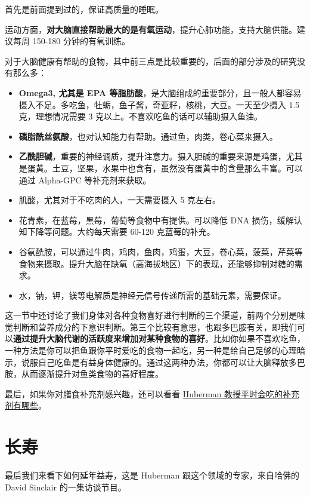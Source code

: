 \documentclass{report}
\begin{document}
首先是前面提到过的，保证高质量的睡眠。

运动方面，\textbf{对大脑直接帮助最大的是有氧运动}，提升心肺功能，支持大脑供能。建议每周 150-180 分钟的有氧训练。

对于大脑健康有帮助的食物，其中前三点是比较重要的，后面的部分涉及的研究没有那么多：

\begin{itemize}
    \item \textbf{Omega3, 尤其是 EPA 等脂肪酸}，是大脑组成的重要部分，且一般人都容易摄入不足。多吃鱼，牡蛎，鱼子酱，奇亚籽，核桃，大豆。一天至少摄入 1.5 克，理想情况需要 3 克以上。不喜欢吃鱼的话可以辅助摄入鱼油。
    \item \textbf{磷脂酰丝氨酸}，也对认知能力有帮助。通过鱼，肉类，卷心菜来摄入。
    \item \textbf{乙酰胆碱}，重要的神经调质，提升注意力。摄入胆碱的重要来源是鸡蛋，尤其是蛋黄。土豆，坚果，水果中也含有，虽然没有蛋黄中的含量那么丰富。可以通过 Alpha-GPC 等补充剂来获取。
    \item 肌酸，尤其对于不吃肉的人，一天需要摄入 5 克左右。
    \item 花青素，在蓝莓，黑莓，葡萄等食物中有提供。可以降低 DNA 损伤，缓解认知下降等问题。大约每天需要 60-120 克蓝莓的补充。
    \item 谷氨酰胺，可以通过牛肉，鸡肉，鱼肉，鸡蛋，大豆，卷心菜，菠菜，芹菜等食物来摄取。提升大脑在缺氧（高海拔地区）下的表现，还能够抑制对糖的需求。
    \item 水，钠，钾，镁等电解质是神经元信号传递所需的基础元素，需要保证。
\end{itemize}

这一节中还讨论了我们身体对各种食物喜好进行判断的三个渠道，前两个分别是味觉判断和营养成分的下意识判断。第三个比较有意思，也跟多巴胺有关，即我们可以\textbf{通过提升大脑代谢的活跃度来增加对某种食物的喜好}。比如你如果不喜欢吃鱼，一种方法是你可以把鱼跟你平时爱吃的食物一起吃，另一种是给自己足够的心理暗示，说服自己吃鱼是有益身体健康的。通过这两种办法，你都可以让大脑释放多巴胺，从而逐渐提升对鱼类食物的喜好程度。

最后，如果你对膳食补充剂感兴趣，还可以看看 \href{https://www.thorne.com/u/huberman}{Huberman 教授平时会吃的补充剂有哪些}。

\chapter{长寿}

最后我们来看下如何延年益寿，这是 Huberman 跟这个领域的专家，来自哈佛的 David Sinclair 的一集访谈节目。
\end{document}
